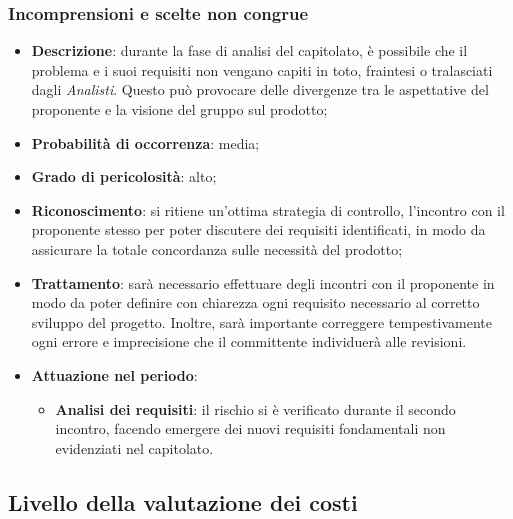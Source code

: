 		\subsubsection{Incomprensioni e scelte non congrue}
		\begin{itemize}
			\item \textbf{Descrizione}: durante la fase di analisi del capitolato, è possibile che il problema e i suoi requisiti non vengano capiti in toto, fraintesi o tralasciati dagli \emph{Analisti}. Questo può provocare delle divergenze tra le aspettative del proponente e la visione del gruppo sul prodotto;
			\item \textbf{Probabilità di occorrenza}: media;
			\item \textbf{Grado di pericolosità}: alto;
			\item \textbf{Riconoscimento}: si ritiene un'ottima strategia di controllo, l'incontro con il proponente stesso per poter discutere dei requisiti identificati, in modo da assicurare la totale concordanza sulle necessità del prodotto;
			\item \textbf{Trattamento}: sarà necessario effettuare degli incontri con il proponente in modo da poter definire con chiarezza ogni requisito necessario al corretto sviluppo del progetto. Inoltre, sarà importante correggere tempestivamente ogni errore e imprecisione che il committente individuerà alle revisioni. 
			\item \textbf{Attuazione nel periodo}:
			\begin{itemize}
				\item \textbf{Analisi dei requisiti}:  il rischio si è verificato durante il secondo incontro, facendo emergere dei nuovi requisiti fondamentali non evidenziati nel capitolato.
			\end{itemize}
		\end{itemize}
	\subsection{Livello della valutazione dei costi}

